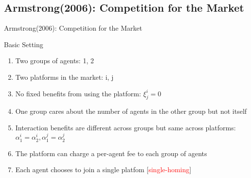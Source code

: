 \documentclass[aspectratio=169]{beamer}  %
\begin{document}
    \subsection{Armstrong(2006): Competition for the Market}
\begin{frame}{Armstrong(2006): Competition for the Market}
    \begin{block}{Basic Setting}
        \begin{enumerate}
            \item Two groups of agents: 1, 2
            \item Two platforms in the market: i, j
            \item No fixed benefits from using the platform: $\xi_{j}^{i} = 0$
            \item One group cares about the number of agents in the other group but not itself
            \item Interaction benefits are different across groups but same across platforms: $\alpha_{1}^{i} = \alpha_{2}^{i}, \alpha_{1}^{j} = \alpha_{2}^{j}$
            \item The platform can charge a per-agent fee to each group of agents
            \item Each agent chooses to join a single platfom [\textcolor{red}{single-homing}]
        \end{enumerate}
    \end{block}
\end{frame}
\end{document}
